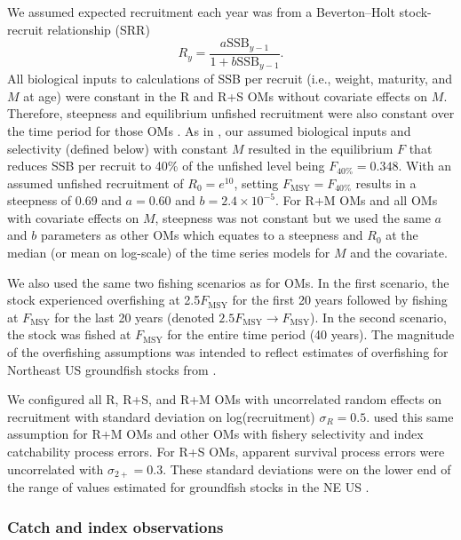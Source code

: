 \documentclass[
  12pt,
]{article}
\newcommand{\Fmsy}{\ensuremath{F_{\text{MSY}}}\xspace}
\begin{document}
We assumed expected recruitment each year was from a Beverton--Holt
stock-recruit relationship (SRR) \[
R_{y} = \frac{a \text{SSB}_{y-1}}{1 + b \text{SSB}_{y-1}}.
\] All biological inputs to calculations of SSB per recruit (i.e.,
weight, maturity, and \(M\) at age) were constant in the R and R+S OMs
without covariate effects on \(M\). Therefore, steepness and equilibrium
unfished recruitment were also constant over the time period for those
OMs \citep{millerbrooks21}. As in \citet{milleretal26}, our assumed
biological inputs and selectivity (defined below) with constant \(M\)
resulted in the equilibrium \(F\) that reduces SSB per recruit to 40\%
of the unfished level being \(F_{40\%} = 0.348\). With an assumed
unfished recruitment of \(R_0 = e^{10}\), setting \(\Fmsy = F_{40\%}\)
results in a steepness of 0.69 and \(a=0.60\) and
\(b = 2.4 \times 10^{-5}\). For R+M OMs and all OMs with covariate
effects on \(M\), steepness was not constant but we used the same \(a\)
and \(b\) parameters as other OMs which equates to a steepness and
\(R_0\) at the median (or mean on log-scale) of the time series models
for \(M\) and the covariate.

We also used the same two fishing scenarios as \citet{milleretal26} for
OMs. In the first scenario, the stock experienced overfishing at
2.5\Fmsy for the first 20 years followed by fishing at \Fmsy for the
last 20 years (denoted \(2.5\Fmsy \rightarrow \Fmsy\)). In the second
scenario, the stock was fished at \Fmsy for the entire time period (40
years). The magnitude of the overfishing assumptions was intended to
reflect estimates of overfishing for Northeast US groundfish stocks from
\citet{wiedenmannetal19}.

We configured all R, R+S, and R+M OMs with uncorrelated random effects
on recruitment with standard deviation on log(recruitment)
\(\sigma_R = 0.5\). \citet{milleretal26} used this same assumption for
R+M OMs and other OMs with fishery selectivity and index catchability
process errors. For R+S OMs, apparent survival process errors were
uncorrelated with \(\sigma_{2+} = 0.3\). These standard deviations were
on the lower end of the range of values estimated for groundfish stocks
in the NE US \citep[see Table S1 in][]{brittenetal26}.

\subsubsection*{Catch and index
observations}\label{catch-and-index-observations}
\end{document}
